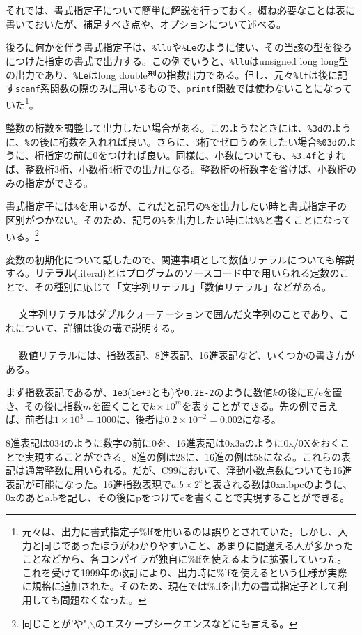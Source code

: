 それでは、書式指定子について簡単に解説を行っておく。概ね必要なことは表に書いておいたが、補足すべき点や、オプションについて述べる。

後ろに何かを伴う書式指定子は、\verb|%llu|や\verb|%Le|のように使い、その当該の型を後ろにつけた指定の書式で出力する。この例でいうと、\verb|%llu|はunsigned long long型の出力であり、\verb|%Le|はlong double型の指数出力である。但し、元々\verb|%lf|は後に記す\verb|scanf|系関数の際のみに用いるもので、\verb|printf|関数では使わないことになっていた\footnote{元々は、出力に書式指定子\%lfを用いるのは誤りとされていた。しかし、入力と同じであったほうがわかりやすいこと、あまりに間違える人が多かったことなどから、各コンパイラが独自に\%lfを使えるように拡張していった。これを受けて1999年の改訂により、出力時に\%lfを使えるという仕様が実際に規格に追加された。そのため、現在では\%lfを出力の書式指定子として利用しても問題なくなった。}。

整数の桁数を調整して出力したい場合がある。このようなときには、\verb|%3d|のように、\verb|%|の後に桁数を入れれば良い。さらに、3桁でゼロうめをしたい場合\verb|%03d|のように、桁指定の前に0をつければ良い。同様に、小数についても、\verb|%3.4f|とすれば、整数桁3桁、小数桁4桁での出力になる。整数桁の桁数字を省けば、小数桁のみの指定ができる。

書式指定子には\verb|%|を用いるが、これだと記号の\verb|%|を出力したい時と書式指定子の区別がつかない。そのため、記号の\verb|%|を出力したい時には\verb|%%|と書くことになっている。\footnote{同じことが'や",$\backslash$のエスケープシークエンスなどにも言える。}


変数の初期化について話したので、関連事項として数値リテラルについても解説する。\textbf{リテラル}(literal)とはプログラムのソースコード中で用いられる定数のことで、その種別に応じて「文字列リテラル」「数値リテラル」などがある。
\\ \\　
文字列リテラルはダブルクォーテーションで囲んだ文字列のことであり、これについて、詳細は後の講で説明する。
\\ \\　
数値リテラルには、指数表記、8進表記、16進表記など、いくつかの書き方がある。

まず指数表記であるが、\verb|1e3|(\verb|1e+3|とも)や\verb|0.2E-2|のように数値$k$の後にE/eを置き、その後に指数$m$を置くことで$k\times 10^m$を表すことができる。先の例で言えば、前者は$1\times 10^3=1000$に、後者は$0.2\times 10^{-2}=0.002$になる。

8進表記は034のように数字の前に0を、16進表記は0x3aのように0x/0Xをおくことで実現することができる。8進の例は28に、16進の例は58になる。これらの表記は通常整数に用いられる。だが、C99において、浮動小数点数についても16進表記が可能になった。16進指数表現で$a.b\times 2^c$と表される数は0xa.bpcのように、0xのあとa.bを記し、その後にpをつけてcを書くことで実現することができる。

